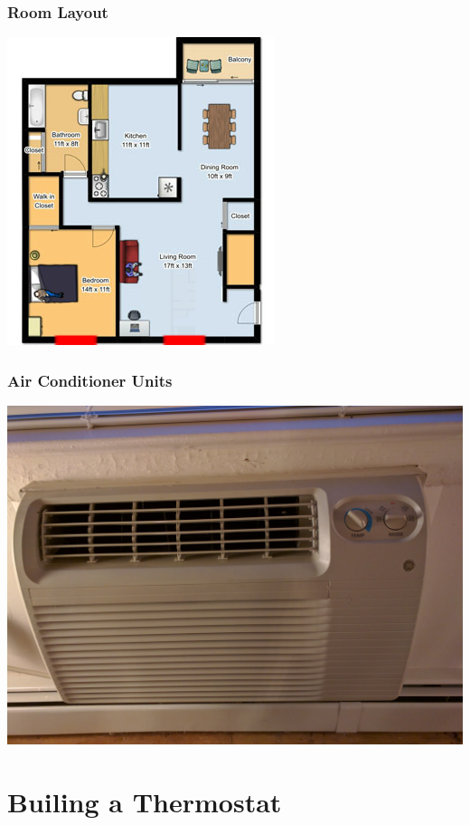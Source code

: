 \documentclass[aspectratio=169,11pt,hyperref={colorlinks=true}]{beamer}
\begin{document}
\begin{frame}
    \frametitle{Room Layout}
    \begin{center}
    \includegraphics[height=.85\textheight]{floorplan.png}
    \end{center}
\end{frame}

\begin{frame}
    \frametitle{Air Conditioner Units}
    \begin{center}
        \includegraphics[width=.75\textwidth]{AC_unit.jpeg}
    \end{center}
\end{frame}

\section{Builing a Thermostat}
\end{document}
